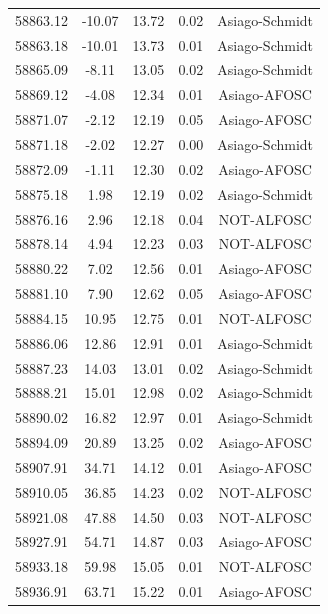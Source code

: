 \begin{longtable}{|c|c|c|c|c|}
 58863.12 &  -10.07 &       13.72 &          0.02 & Asiago-Schmidt   \\
 58863.18 &  -10.01 &       13.73 &          0.01 & Asiago-Schmidt \\
 58865.09 &   -8.11 &       13.05 &          0.02 & Asiago-Schmidt \\
 58869.12 &   -4.08 &       12.34 &          0.01 & Asiago-AFOSC  \\
 58871.07 &   -2.12 &       12.19 &          0.05 & Asiago-AFOSC  \\
 58871.18 &   -2.02 &       12.27 &          0.00 & Asiago-Schmidt \\
 58872.09 &   -1.11 &       12.30 &          0.02 & Asiago-AFOSC    \\
 58875.18 &    1.98 &       12.19 &          0.02 & Asiago-Schmidt \\
 58876.16 &    2.96 &       12.18 &          0.04 & NOT-ALFOSC   \\
 58878.14 &    4.94 &       12.23 &          0.03 & NOT-ALFOSC   \\
 58880.22 &    7.02 &       12.56 &          0.01 & Asiago-AFOSC  \\
 58881.10 &    7.90 &       12.62 &          0.05 & Asiago-AFOSC  \\
 58884.15 &   10.95 &       12.75 &          0.01 & NOT-ALFOSC   \\
 58886.06 &   12.86 &       12.91 &          0.01 & Asiago-Schmidt \\
 58887.23 &   14.03 &       13.01 &          0.02 & Asiago-Schmidt \\
 58888.21 &   15.01 &       12.98 &          0.02 & Asiago-Schmidt \\
 58890.02 &   16.82 &       12.97 &          0.01 & Asiago-Schmidt \\
 58894.09 &   20.89 &       13.25 &          0.02 & Asiago-AFOSC  \\
 58907.91 &   34.71 &       14.12 &          0.01 & Asiago-AFOSC  \\
 58910.05 &   36.85 &       14.23 &          0.02 & NOT-ALFOSC   \\
 58921.08 &   47.88 &       14.50 &          0.03 & NOT-ALFOSC   \\
 58927.91 &   54.71 &       14.87 &          0.03 & Asiago-AFOSC  \\
 58933.18 &   59.98 &       15.05 &          0.01 & NOT-ALFOSC   \\
 58936.91 &   63.71 &       15.22 &          0.01 & Asiago-AFOSC  \\

\end{longtable}
